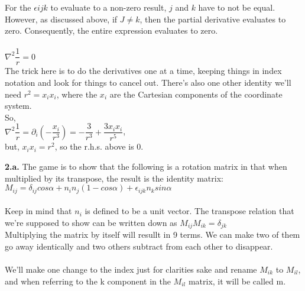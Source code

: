 \documentclass[prb,preprint]
{revtex4-1}
\newcommand{\PRLsep}{\noindent\makebox[\linewidth]{\resizebox{0.8888\linewidth}{2pt}{$\bullet$}}\bigskip}
\begin{document}
For the $\epsilon{ijk}$ to evaluate to a non-zero result, $j$ and $k$ have to not be equal.  However, as discussed above, if $J \ne k$, then the partial derivative evaluates to zero.  Consequently, the entire expression evaluates to zero.
\\
\PRLsep
\\
$\nabla^2 \dfrac{1}{r} = 0$\\
The trick here is to do the derivatives one at a time, keeping things in index notation and look for things to cancel out.  There's also one other identity we'll need $r^2 = x_i x_i$, where the $x_i$ are the Cartesian components of the coordinate system.
\\
So,
\\
$\nabla^2 \dfrac{1}{r} = \partial_i \left(- \dfrac{x_i}{r^3}\right) = -\dfrac{3}{r^3} + \dfrac{3x_i x_i}{r^5}$,
\\
but, $x_i x_i = r^2$, so the r.h.s. above is 0.
\\
\PRLsep

\newpage

{\bf 2.a.} The game is to show that the following is a rotation matrix in that when multiplied by its transpose, the result is the identity matrix:\\
$M_{ij} = \delta_{ij}cos \alpha + n_i n_j \left(1 - cos \alpha\right) + \epsilon_{ijk}n_k sin \alpha$
\\\\
Keep in mind that $n_i$ is defined to be a unit vector.  The transpose relation that we're supposed to show can be written down as $M_{ij}M_{ik} = \delta_{jk}$\\


Multiplying the matrix by itself will resullt in 9 terms.  We can make two of them go away identically and two others subtract from each other to disappear.\\\\

We'll make one change to the index just for clarities sake and rename $M_{ik}$ to $M_{il}$, and when referring to the k component in the $M_{il}$ matrix, it will be called m.
\end{document}
